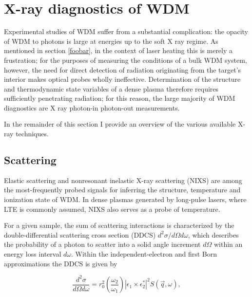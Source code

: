 
\section{X-ray diagnostics of WDM}
Experimental studies of WDM suffer from a substantial complication: the opacity of WDM to photons is large at energies up to the soft X ray regime. As mentioned in section \ref{foobar}, in the context of laser heating this is merely a frustration; for the purposes of measuring the conditions of a bulk WDM system, however, the need for direct detection of radiation originating from the target's interior makes optical probes wholly ineffective. Determination of the structure and thermodynamic state variables of a dense plasma therefore requires sufficiently penetrating radiation; for this reason, the large majority of WDM diagnostics are X ray photon-in photon-out measurements. 

In the remainder of this section I provide an overview of the various available X-ray techniques.

\subsection{Scattering}
Elastic scattering and nonresonant inelastic X-ray scattering (NIXS) are among the most-frequently probed signals for inferring the structure, temperature and ionization state of WDM. In dense plasmas generated by long-pulse lasers, where LTE is commonly assumed, NIXS also serves as a probe of temperature.

For a given sample, the sum of scattering interactions is characterized by the double-differential scattering cross section (DDCS) $d^2\sigma/d\Omega d\omega$, which describes the probability of a photon to scatter into a solid angle increment $d\Omega$ within an energy loss interval $d\omega$. Within the independent-electron and first Born approximations the DDCS is given by

\label{ddcs}
\begin{equation}
\frac{d^2\sigma}{d\Omega d\omega} = r_0^2 (\frac{\omega_2}{\omega_1}) |\epsilon_1 \times \epsilon_2^*|^2 S(\vec{q}, \omega),
\end{equation}

